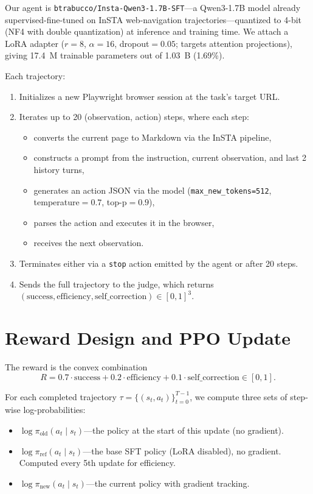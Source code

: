 \documentclass[12pt,a4paper]{report}
\begin{document}
Our agent is \texttt{btrabucco/Insta-Qwen3-1.7B-SFT}---a Qwen3-1.7B model already supervised-fine-tuned on InSTA web-navigation trajectories---quantized to 4-bit (NF4 with double quantization) at inference and training time. We attach a LoRA adapter ($r=8$, $\alpha=16$, dropout$=0.05$; targets attention projections), giving 17.4~M trainable parameters out of 1.03~B (1.69\%).

Each trajectory:
\begin{enumerate}
  \item Initializes a new Playwright browser session at the task's target URL.
  \item Iterates up to 20 (observation, action) steps, where each step:
    \begin{itemize}
      \item converts the current page to Markdown via the InSTA pipeline,
      \item constructs a prompt from the instruction, current observation, and last 2 history turns,
      \item generates an action JSON via the model (\texttt{max\_new\_tokens=512}, temperature$=0.7$, top-p$=0.9$),
      \item parses the action and executes it in the browser,
      \item receives the next observation.
    \end{itemize}
  \item Terminates either via a \texttt{stop} action emitted by the agent or after 20 steps.
  \item Sends the full trajectory to the judge, which returns $(\text{success}, \text{efficiency}, \text{self\_correction}) \in [0, 1]^3$.
\end{enumerate}

\section{Reward Design and PPO Update}\label{sec:ppo-update}

The reward is the convex combination
\begin{equation}
  R = 0.7 \cdot \text{success} + 0.2 \cdot \text{efficiency} + 0.1 \cdot \text{self\_correction} \in [0, 1].
\end{equation}

For each completed trajectory $\tau = \{(s_t, a_t)\}_{t=0}^{T-1}$, we compute three sets of step-wise log-probabilities:
\begin{itemize}
  \item $\log \pi_\text{old}(a_t \mid s_t)$---the policy at the start of this update (no gradient).
  \item $\log \pi_\text{ref}(a_t \mid s_t)$---the base SFT policy (LoRA disabled), no gradient. Computed every 5th update for efficiency.
  \item $\log \pi_\text{new}(a_t \mid s_t)$---the current policy with gradient tracking.
\end{itemize}
\end{document}
